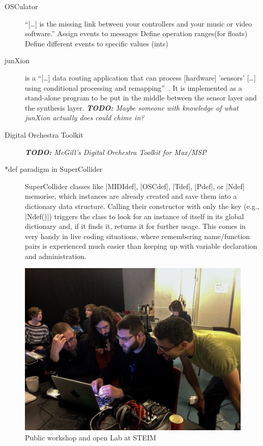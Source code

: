 \documentclass{article}
\newcommand{\todo}[1] {\emph{\textbf{TODO:} #1}}
\begin{document}
\begin{description}
	\item[OSCulator] 
		\enquote{[\dots] is the missing link between your controllers and your music or video software.}
		Assign events to messages
		Define operation ranges(for floats)
		Define different events to specific values (ints) 
	\item[junXion] 
		is a \enquote{[\dots] data routing application that can process [hardware] 'sensors' [\dots] using conditional processing and remapping}~\cite{-jun}. 
		It is implemented as a stand-alone program to be put in the middle between the sensor layer and the synthesis layer.
		\todo{Maybe someone with knowledge of what junXion actually does could chime in?}
	\item[Digital Orchestra Toolkit] \todo{McGill's Digital Orchestra Toolkit for Max/MSP}
	\item[*def paradigm in SuperCollider] 
		SuperCollider classes like |MIDIdef|, |OSCdef|, |Tdef|, |Pdef|, or |Ndef| memorise, which instances are already created and save them into a dictionary data structure. 
		Calling their constructor with only the key (e.g., |Ndef(\a)|) triggers the class to look for an instance of itself in its global dictionary and, if it finds it, returns it for further usage. This comes in very handy in live coding situations, where remembering name/function pairs is experienced much easier than keeping up with variable declaration and administration.
\end{description}



\begin{figure}[h]
	\centering
		\includegraphics[width=.9\columnwidth]{../media/20140403-IMG_1667.jpg}
	\caption{Public workshop and open Lab at STEIM}
	\label{fig:media_20140403-IMG_1667}
\end{figure}
\end{document}

